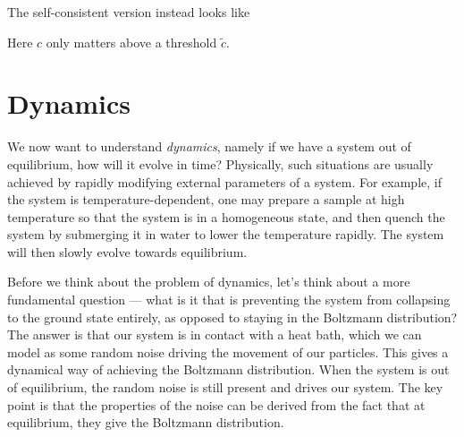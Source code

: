 \documentclass[a4paper]{article}
\begin{document}
The self-consistent version instead looks like
\begin{center}
\end{center}
Here $c$ only matters above a threshold $\tilde{c}$.

\section{Dynamics}
We now want to understand \emph{dynamics}, namely if we have a system out of equilibrium, how will it evolve in time? Physically, such situations are usually achieved by rapidly modifying external parameters of a system. For example, if the system is temperature-dependent, one may prepare a sample at high temperature so that the system is in a homogeneous state, and then quench the system by submerging it in water to lower the temperature rapidly. The system will then slowly evolve towards equilibrium.

Before we think about the problem of dynamics, let's think about a more fundamental question --- what is it that is preventing the system from collapsing to the ground state entirely, as opposed to staying in the Boltzmann distribution? The answer is that our system is in contact with a heat bath, which we can model as some random noise driving the movement of our particles. This gives a dynamical way of achieving the Boltzmann distribution. When the system is out of equilibrium, the random noise is still present and drives our system. The key point is that the properties of the noise can be derived from the fact that at equilibrium, they give the Boltzmann distribution.
\end{document}
